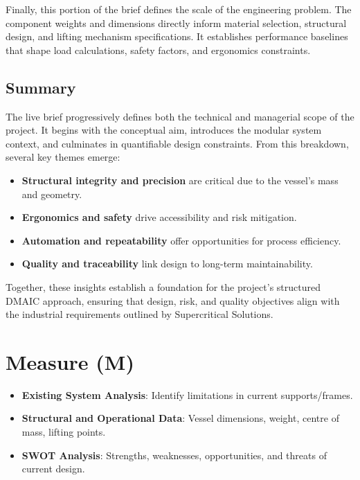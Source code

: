 \documentclass{report}
\begin{document}
Finally, this portion of the brief defines the scale of the engineering problem. The component weights and dimensions directly inform material selection, structural design, and lifting mechanism specifications. It establishes performance baselines that shape load calculations, safety factors, and ergonomics constraints.

\subsection{Summary}
The live brief progressively defines both the technical and managerial scope of the project. It begins with the conceptual aim, introduces the modular system context, and culminates in quantifiable design constraints. From this breakdown, several key themes emerge:
\begin{itemize}[itemsep=-1mm]
	\item \textbf{Structural integrity and precision} are critical due to the vessel’s mass and geometry.
	\item \textbf{Ergonomics and safety} drive accessibility and risk mitigation.
	\item \textbf{Automation and repeatability} offer opportunities for process efficiency.
	\item \textbf{Quality and traceability} link design to long-term maintainability.	
\end{itemize}
Together, these insights establish a foundation for the project’s structured DMAIC approach, ensuring that design, risk, and quality objectives align with the industrial requirements outlined by Supercritical Solutions.



\newpage

\section{Measure (M)}
\color{red!50!black}
\begin{itemize}[itemsep=-1mm]
	\item \textbf{Existing System Analysis}: Identify limitations in current supports/frames.
	\item \textbf{Structural and Operational Data}: Vessel dimensions, weight, centre of mass, lifting points.
	\item \textbf{SWOT Analysis}: Strengths, weaknesses, opportunities, and threats of current design.
\end{itemize}
\color{black}
\newpage
\end{document}
